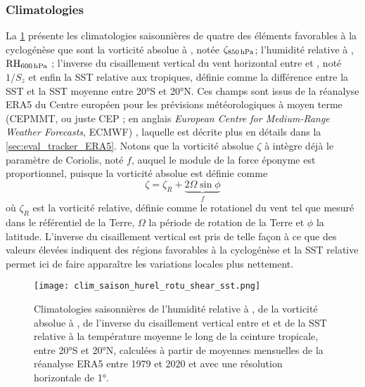 \documentclass[../main.tex]{subfiles}
\begin{document}
\subsubsection*{Climatologies}\label{sec:climato_ingredients}

La \cref{fig:clim_ingredients} présente les climatologies saisonnières de quatre des éléments favorables à la cyclogénèse que sont la vorticité absolue à
, notée $\zeta_{\text{\hPa{850}}}$; l'humidité relative à , $\text{RH}_{\text{\hPa{600}}}$ ; l'inverse du cisaillement vertical du vent
horizontal entre  et , noté $1/S_z$ et enfin la SST relative aux tropiques, définie comme la différence entre la SST et la SST moyenne entre \ang{20}S et \ang{20}N. Ces champs sont issus de la réanalyse ERA5 du Centre européen pour
les prévisions météorologiques à moyen terme (CEPMMT, ou juste CEP ; en anglais \textit{European Centre for Medium-Range Weather Forecasts}, ECMWF)
\parencite{hersbach_era5_2020}, laquelle est décrite plus en détails dans la \cref{sec:eval_tracker_ERA5}. Notons que la vorticité absolue $\zeta$ à  intègre
déjà le paramètre de Coriolis, noté $f$, auquel le module de la force éponyme est proportionnel, puisque la vorticité absolue est définie comme
%
\begin{equation*}
    \zeta = \zeta_R + \underbrace{2 \Omega \sin \phi}_{f}
\end{equation*}
%
où $\zeta_R$ est la vorticité relative, définie comme le rotationel du vent tel que mesuré dans le référentiel de la Terre, $\Omega$ la période de
rotation de la Terre et $\phi$ la latitude. L'inverse du cisaillement vertical est pris de telle façon à ce que des valeurs élevées indiquent des régions
favorables à la cyclogénèse et la SST relative permet ici de faire apparaître les variations locales plus nettement.

\begin{figure}[tp]
    \centering
    \texttt{[image: clim\_saison\_hurel\_rotu\_shear\_sst.png]}
    \caption{Climatologies saisonnières de l'humidité relative à , de la vorticité absolue à , de l'inverse du cisaillement vertical entre
     et  et de la SST relative à la température moyenne le long de la ceinture tropicale, entre \ang{20}S et \ang{20}N, calculées à partir de
    moyennes mensuelles de la réanalyse ERA5 entre 1979 et 2020 et avec une résolution horizontale de \ang{1}.}
    \label{fig:clim_ingredients}
\end{figure}
\end{document}
